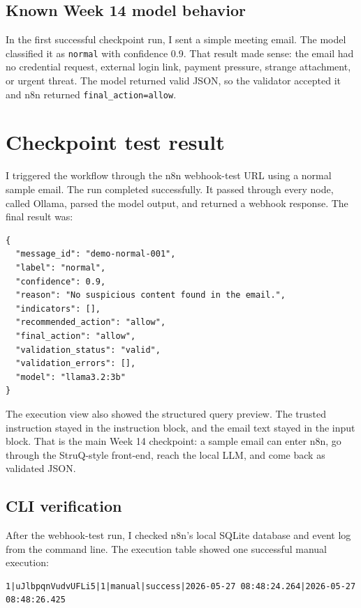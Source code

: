 \documentclass[11pt,a4paper]{article}
\begin{document}
\subsection{Known Week 14 model behavior}

In the first successful checkpoint run, I sent a simple meeting email. The model classified it as \texttt{normal} with confidence 0.9. That result made sense: the email had no credential request, external login link, payment pressure, strange attachment, or urgent threat. The model returned valid JSON, so the validator accepted it and n8n returned \texttt{final\_action=allow}.

\section{Checkpoint test result}

I triggered the workflow through the n8n webhook-test URL using a normal sample email. The run completed successfully. It passed through every node, called Ollama, parsed the model output, and returned a webhook response. The final result was:

\begin{lstlisting}[caption={Validated webhook response from the Week 14 normal email test.}]
{
  "message_id": "demo-normal-001",
  "label": "normal",
  "confidence": 0.9,
  "reason": "No suspicious content found in the email.",
  "indicators": [],
  "recommended_action": "allow",
  "final_action": "allow",
  "validation_status": "valid",
  "validation_errors": [],
  "model": "llama3.2:3b"
}
\end{lstlisting}

The execution view also showed the structured query preview. The trusted instruction stayed in the instruction block, and the email text stayed in the input block. That is the main Week 14 checkpoint: a sample email can enter n8n, go through the StruQ-style front-end, reach the local LLM, and come back as validated JSON.

\subsection{CLI verification}

After the webhook-test run, I checked n8n's local SQLite database and event log from the command line. The execution table showed one successful manual execution:

\begin{lstlisting}[caption={Execution record checked through SQLite.}]
1|uJlbpqnVudvUFLi5|1|manual|success|2026-05-27 08:48:24.264|2026-05-27 08:48:26.425
\end{lstlisting}
\end{document}
